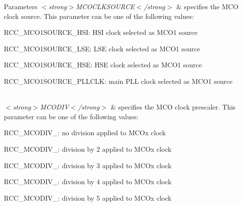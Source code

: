 \begin{DoxyParams}{Parameters}
{\em $<$strong$>$\+M\+C\+O\+C\+L\+K\+S\+O\+U\+R\+C\+E$<$/strong$>$} & specifies the M\+CO clock source. This parameter can be one of the following values\+: \begin{DoxyItemize}
\item R\+C\+C\+\_\+\+M\+C\+O1\+S\+O\+U\+R\+C\+E\+\_\+\+H\+SI\+: H\+SI clock selected as M\+C\+O1 source \item R\+C\+C\+\_\+\+M\+C\+O1\+S\+O\+U\+R\+C\+E\+\_\+\+L\+SE\+: L\+SE clock selected as M\+C\+O1 source \item R\+C\+C\+\_\+\+M\+C\+O1\+S\+O\+U\+R\+C\+E\+\_\+\+H\+SE\+: H\+SE clock selected as M\+C\+O1 source \item R\+C\+C\+\_\+\+M\+C\+O1\+S\+O\+U\+R\+C\+E\+\_\+\+P\+L\+L\+C\+LK\+: main P\+LL clock selected as M\+C\+O1 source \end{DoxyItemize}
\\
\hline
{\em $<$strong$>$\+M\+C\+O\+D\+I\+V$<$/strong$>$} & specifies the M\+CO clock prescaler. This parameter can be one of the following values\+: \begin{DoxyItemize}
\item R\+C\+C\+\_\+\+M\+C\+O\+D\+I\+V\+\_\+: no division applied to M\+C\+Ox clock \item R\+C\+C\+\_\+\+M\+C\+O\+D\+I\+V\+\_\+: division by 2 applied to M\+C\+Ox clock \item R\+C\+C\+\_\+\+M\+C\+O\+D\+I\+V\+\_\+: division by 3 applied to M\+C\+Ox clock \item R\+C\+C\+\_\+\+M\+C\+O\+D\+I\+V\+\_\+: division by 4 applied to M\+C\+Ox clock \item R\+C\+C\+\_\+\+M\+C\+O\+D\+I\+V\+\_\+: division by 5 applied to M\+C\+Ox clock \end{DoxyItemize}
\\
\hline
\end{DoxyParams}

